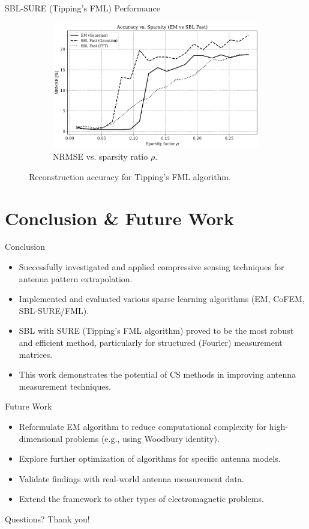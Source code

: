 \documentclass{beamer}
\begin{document}
\begin{frame}{SBL-SURE (Tipping's FML) Performance}
\begin{figure}[h!]
\begin{subfigure}[b]{0.48\textwidth}
            \includegraphics[width=\textwidth]{Figures/accuracy_vs_sparsity_EMvsSB_woEMFFT.png}
            \caption{NRMSE vs. sparsity ratio $\rho$. }
        \end{subfigure}
        \caption{Reconstruction accuracy for Tipping's FML algorithm.}
    \end{figure}
\end{frame}

\section{Conclusion & Future Work}
\begin{frame}{Conclusion}
    \begin{itemize}
        \item Successfully investigated and applied compressive sensing techniques for antenna pattern extrapolation. 
        \item Implemented and evaluated various sparse learning algorithms (EM, CoFEM, SBL-SURE/FML). 
        \item SBL with SURE (Tipping's FML algorithm) proved to be the most robust and efficient method, particularly for structured (Fourier) measurement matrices. 
        \item This work demonstrates the potential of CS methods in improving antenna measurement techniques. 
    \end{itemize}
\end{frame}

\begin{frame}{Future Work}
    \begin{itemize}
        \item Reformulate EM algorithm to reduce computational complexity for high-dimensional problems (e.g., using Woodbury identity). 
        \item Explore further optimization of algorithms for specific antenna models.
        \item Validate findings with real-world antenna measurement data.
        \item Extend the framework to other types of electromagnetic problems.
    \end{itemize}
\end{frame}

\begin{frame}
    \centering
    \textsf{\Huge Questions?}
    \vspace{1cm}
    \textsf{\Large Thank you!}
\end{frame}
\end{document}
